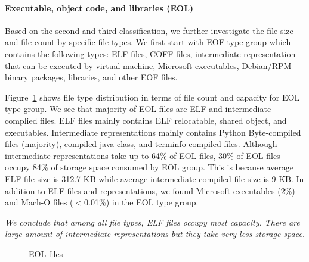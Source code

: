 
\paragraph{Executable, object code, and libraries (EOL)}
Based on the second-and third-classification, we further investigate the file size and file count by specific file types. We first start with EOF type group which contains the following types: ELF files, COFF files, intermediate representation that can be executed by virtual machine, Microsoft executables, Debian/RPM binary packages, libraries, and other EOF files.

Figure~\ref{fig:type-eof} shows file type distribution in terms of file count and capacity for EOL type group. 
We see that majority of EOL files are ELF and intermediate complied files. ELF files mainly contains ELF relocatable, shared object, and executables. Intermediate representations mainly contains Python Byte-compiled files (majority), compiled java class, and terminfo compiled files. Although intermediate representations take up to 64\% of EOL files, 30\% of EOL files occupy 84\% of storage space consumed by EOL group. 
This is because average ELF file size is 312.7 KB while average intermediate compiled file size is 9 KB. In addition to ELF files and representations, we found Microsoft executables (2\%) and Mach-O files ($<$0.01\%) in the EOL type group.

\textit{We conclude that among all file types, ELF files occupy most capacity. There are large amount of intermediate representations but they take very less storage space.}

\begin{figure}
	\centering
	\caption{EOL files}
	\label{fig:type-eof}
\end{figure}

